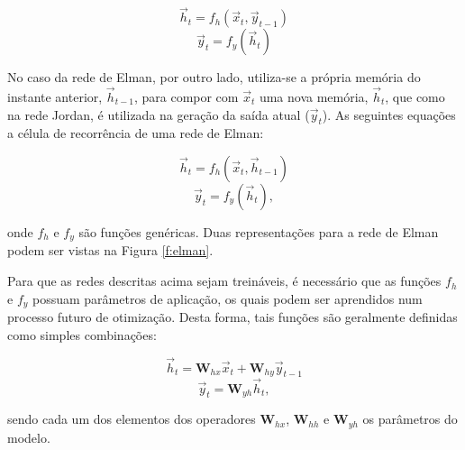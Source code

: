      \begin{equation} \label{e:jordan_ht}
        \vec{h}_t = f_h(\vec{x}_t, \vec{y}_{t-1})
      \end{equation}
      \begin{equation} \label{e:jordan_yt}
        \vec{y}_t = f_y(\vec{h}_t)
      \end{equation}

      No caso da rede de Elman, por outro lado, utiliza-se a própria memória do instante anterior, $\vec{h}_{t-1}$, para compor com $\vec{x}_t$ uma nova memória, $\vec{h}_t$, que como na rede Jordan, é utilizada na geração da saída atual ($\vec{y}_t$). As seguintes equações \DIFaddbegin {}\DIFaddend a célula de recorrência de uma rede de Elman:

      \begin{equation} \label{e:elman_ht}
        \vec{h}_t = f_h(\vec{x}_t, \vec{h}_{t-1})
      \end{equation}
      \begin{equation} \label{e:elman_yt}
        \vec{y}_t = f_y(\vec{h}_t)
        ,
      \end{equation}

    \noindent onde $f_h$ e $f_y$ são funções genéricas. Duas representações para a rede de Elman podem ser vistas na Figura \ref{f:elman}.

      Para que as redes descritas acima sejam treináveis, é necessário que as funções $f_h$ e $f_y$ possuam parâmetros de aplicação, os quais podem ser aprendidos num processo futuro de otimização. Desta forma, tais funções são geralmente definidas como simples combinações:

      \begin{equation} \label{e:jordan_linear_part_ht}
        \vec{h}_t = \boldsymbol{W}_{hx} \vec{x}_t + \boldsymbol{W}_{hy} \vec{y}_{t-1}
      \end{equation}
      \begin{equation} \label{e:jordan_linear_part_yt}
        \vec{y}_t = \boldsymbol{W}_{yh} \vec{h}_t
        ,
      \end{equation}

      \noindent sendo cada um dos elementos dos operadores $\boldsymbol{W}_{hx}$, $\boldsymbol{W}_{hh}$ e $\boldsymbol{W}_{yh}$ os parâmetros do modelo.

